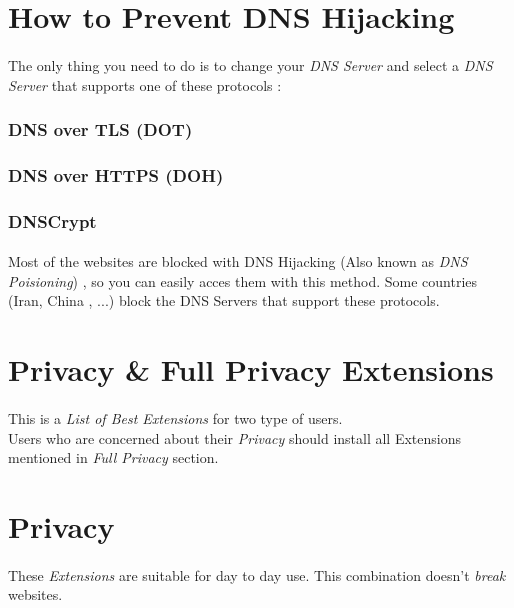 \documentclass[12pt, a4paper]{article}
\begin{document}
\section*{How to Prevent DNS Hijacking}
\paragraph{}
The only thing you need to do is to change your \emph{DNS Server} and select a \emph{DNS Server} that supports one of these protocols : 
\subsubsection*{DNS over TLS (DOT)}
\subsubsection*{DNS over HTTPS (DOH)}
\subsubsection*{DNSCrypt\\}

\begin{large}
	\paragraph{}
	Most of the websites are blocked with DNS Hijacking (Also known as \emph{DNS Poisioning}) , so you can easily acces them with this method. Some countries (Iran, China , ...) block the DNS Servers that support these protocols.
\end{large}

\newpage
\section*{Privacy \& Full Privacy Extensions}
\paragraph{}
This is a \emph{List of Best Extensions} for two type of users.\\
Users who are concerned about their \emph{Privacy} should install all Extensions mentioned in \emph{Full Privacy} section.

\section{Privacy}
\paragraph{}
These \emph{Extensions} are suitable for day to day use. This combination doesn't \emph{break} websites.
\end{document}
